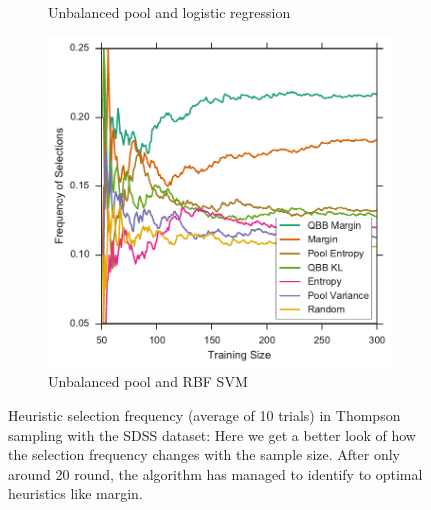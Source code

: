 \begin{figure}[p]
\begin{subfigure}{.5\textwidth}
		\caption{Unbalanced pool and logistic regression}
		\label{fig:sdss_ul_frequencies}
	\end{subfigure}%
	\begin{subfigure}{.5\textwidth}
		\centering
		\includegraphics[width=\linewidth]{figures/5_thompson/sdss_ur_frequencies}
		\caption{Unbalanced pool and RBF SVM}
		\label{fig:sdss_ur_frequencies}
	\end{subfigure}
	\caption[Heuristic selection frequency (SDSS)]{ Heuristic selection frequency (average of 10
        trials) in Thompson sampling with the SDSS dataset: Here we get a better look of how the selection
        frequency changes with the sample size. After only around 20 round, the algorithm has managed to
        identify to optimal heuristics like margin.} \label{fig:sdss_frequencies}
\end{figure}


